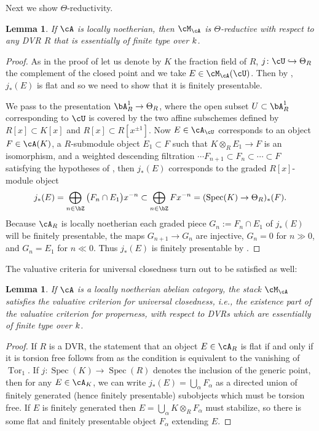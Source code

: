 \documentclass[a4paper]{amsart}
\numberwithin{equation}{section}
\theoremstyle{plain}
\newtheorem{lem}[thm]{Lemma}
\theoremstyle{definition}
\DeclareMathOperator{\Spec}{Spec}
\newcommand{\hookarr}{\hookrightarrow}
\DeclareMathOperator{\Tor}{Tor}
\newcommand{\co}{\colon}
\begin{document}
Next we show $\Theta$-reductivity.
\begin{lem} \label{L:abelian_Theta_reductive}
	If $\cA$ is locally noetherian, then $\cM_\cA$ is $\Theta$-reductive with respect to any DVR $R$ that is essentially of finite type over ${k}$.
\end{lem}
\begin{proof}
	As in the proof of  let us denote by  $K$ the fraction field of $R$, $j \co \cU \hookarr \Theta_R$
 	 the complement of the closed point and we take $E \in \cM_{\cA}(\cU)$. Then by , $j_\ast(E)$ is flat and so we need to show that it is finitely presentable.
	
	We pass to the presentation $\bA^1_R\to \Theta_R$, where the open subset $U \subset \bA^1_R$ corresponding to $\cU$ is covered by the two affine subschemes defined by $R[x] \subset K[x]$ and $R[x] \subset R[x^{\pm1}]$. Now $E \in \cA_\cU$ corresponds to an object $F \in \cA(K)$, a $R$-submodule object $E_1 \subset F$ such that $K \otimes_R E_1 \to F$ is an isomorphism, and a weighted descending filtration $\cdots F_{n+1} \subset F_n \subset \cdots \subset F$ satisfying the hypotheses of , then $j_\ast(E)$ corresponds to the graded $R[x]$-module object
	\[
	j_\ast(E) = \bigoplus_{n \in \bZ} \big( F_{n} \cap E_1 \big) x^{-n} \subset \bigoplus_{n \in \bZ} F x^{-n} = (\Spec(K) \to \Theta_R)_\ast(F). 
	\]
	Because $\cA_R$ is locally noetherian each graded piece $G_n := F_n \cap E_1$ of $j_\ast(E)$ will be finitely presentable, the maps $G_{n+1} \to G_n$ are injective, $G_n = 0$ for $n \gg0$, and $G_n = E_1$ for $n \ll 0$. Thus $j_\ast(E)$ is finitely presentable by .
\end{proof}

The valuative criteria for universal closedness turn out to be satisfied as well:
\begin{lem} \label{L:abelian_properness}
	If $\cA$ is a locally noetherian abelian category, the stack $\cM_\cA$ satisfies the valuative criterion for universal closedness, i.e., the existence part of the valuative criterion for properness, with respect to DVRs which are essentially of finite type over $k$.
\end{lem}
\begin{proof}
If $R$ is a DVR, the statement that an object $E\in \cA_R$ is flat if and only if it is torsion free follows from  \cite[Lem.~C1.12]{artin-zhang} as the condition is equivalent to the vanishing of $\Tor_1$. If $j \co \Spec(K) \to \Spec(R)$ denotes the inclusion of the generic point, then for any $E \in \cA_{K}$, we can write $j_\ast(E) = \bigcup_\alpha F_\alpha$ as a directed union of finitely generated (hence finitely presentable) subobjects which must be torsion free. If $E$ is finitely generated then $E = \bigcup_\alpha K \otimes_R F_\alpha$ must stabilize, so there is some flat and finitely presentable object $F_\alpha$ extending $E$.
\end{proof}
\end{document}
